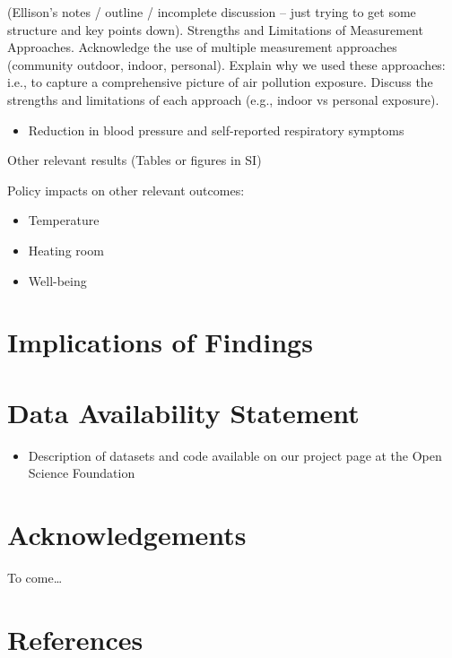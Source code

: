 \documentclass[
  letterpaper,
  DIV=11,
  numbers=noendperiod]{scrartcl}
\providecommand{\tightlist}{%
  \setlength{\itemsep}{0pt}\setlength{\parskip}{0pt}}\usepackage{longtable,booktabs,array}
\begin{document}
(Ellison's notes / outline / incomplete discussion -- just trying to get
some structure and key points down). Strengths and Limitations of
Measurement Approaches. Acknowledge the use of multiple measurement
approaches (community outdoor, indoor, personal). Explain why we used
these approaches: i.e., to capture a comprehensive picture of air
pollution exposure. Discuss the strengths and limitations of each
approach (e.g., indoor vs personal exposure).

\begin{itemize}
\tightlist
\item
  Reduction in blood pressure and self-reported respiratory symptoms
\end{itemize}

Other relevant results (Tables or figures in SI)

Policy impacts on other relevant outcomes:

\begin{itemize}
\tightlist
\item
  Temperature
\item
  Heating room
\item
  Well-being
\end{itemize}

\hypertarget{implications-of-findings}{%
\section{Implications of Findings}\label{implications-of-findings}}

\hypertarget{data-availability-statement}{%
\section{Data Availability
Statement}\label{data-availability-statement}}

\begin{itemize}
\tightlist
\item
  Description of datasets and code available on our project page at the
  Open Science Foundation
\end{itemize}

\hypertarget{acknowledgements}{%
\section{Acknowledgements}\label{acknowledgements}}

To come\ldots{}

\hypertarget{references}{%
\section{References}\label{references}}
\end{document}
